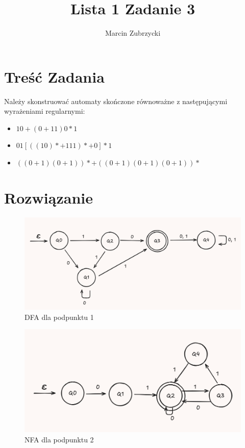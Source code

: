 \documentclass{article}
\title{Lista 1 Zadanie 3}
\author{Marcin Zubrzycki}
\begin{document}
\maketitle
\section{Treść Zadania}
Należy skonstruować automaty skończone równoważne z następującymi wyrażeniami regularnymi:
\begin{itemize}
  \item $10+(0+11)0*1$
  \item $01[((10)*+111)*+0]*1$
  \item $((0+1)(0+1))*+((0+1)(0+1)(0+1))*$
\end{itemize}
\section{Rozwiązanie}
\begin{figure}[h]
  \includegraphics[width=1\textwidth]{11.png}
  \caption{DFA dla podpunktu 1}
\end{figure}
\begin{figure}[h]
  \includegraphics[width=1\textwidth]{12.png}
  \caption{NFA dla podpunktu 2}
\end{figure}
\end{document}
